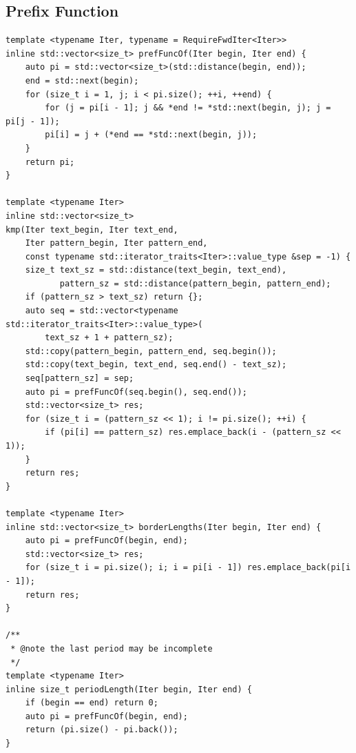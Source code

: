\documentclass[UTF8]{article}
\begin{document}
\subsection{Prefix Function}
\begin{verbatim}
template <typename Iter, typename = RequireFwdIter<Iter>>
inline std::vector<size_t> prefFuncOf(Iter begin, Iter end) {
	auto pi = std::vector<size_t>(std::distance(begin, end));
	end = std::next(begin);
	for (size_t i = 1, j; i < pi.size(); ++i, ++end) {
		for (j = pi[i - 1]; j && *end != *std::next(begin, j); j = pi[j - 1]);
		pi[i] = j + (*end == *std::next(begin, j));
	}
	return pi;
}

template <typename Iter>
inline std::vector<size_t>
kmp(Iter text_begin, Iter text_end,
	Iter pattern_begin, Iter pattern_end,
	const typename std::iterator_traits<Iter>::value_type &sep = -1) {
	size_t text_sz = std::distance(text_begin, text_end),
		   pattern_sz = std::distance(pattern_begin, pattern_end);
	if (pattern_sz > text_sz) return {};
	auto seq = std::vector<typename std::iterator_traits<Iter>::value_type>(
		text_sz + 1 + pattern_sz);
	std::copy(pattern_begin, pattern_end, seq.begin());
	std::copy(text_begin, text_end, seq.end() - text_sz);
	seq[pattern_sz] = sep;
	auto pi = prefFuncOf(seq.begin(), seq.end());
	std::vector<size_t> res;
	for (size_t i = (pattern_sz << 1); i != pi.size(); ++i) {
		if (pi[i] == pattern_sz) res.emplace_back(i - (pattern_sz << 1));
	}
	return res;
}

template <typename Iter>
inline std::vector<size_t> borderLengths(Iter begin, Iter end) {
	auto pi = prefFuncOf(begin, end);
	std::vector<size_t> res;
	for (size_t i = pi.size(); i; i = pi[i - 1]) res.emplace_back(pi[i - 1]);
	return res;
}

/**
 * @note the last period may be incomplete
 */
template <typename Iter>
inline size_t periodLength(Iter begin, Iter end) {
	if (begin == end) return 0;
	auto pi = prefFuncOf(begin, end);
	return (pi.size() - pi.back());
}
\end{verbatim}
\end{document}
